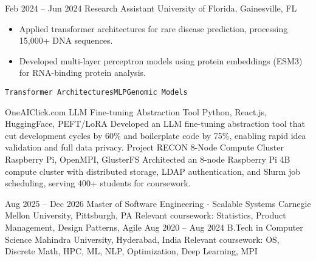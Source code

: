\documentclass[9pt]{developercv} %
\begin{document}
\begin{entrylist}
{        }
	\entry
		{Feb 2024 -- Jun 2024}
		{Research Assistant}
		{University of Florida, Gainesville, FL}
		{
            \begin{itemize}
                \item Applied transformer architectures for rare disease prediction, processing 15,000+ DNA sequences.
                \item Developed multi-layer perceptron models using protein embeddings (ESM3) for RNA-binding protein analysis.
            \end{itemize}
            \texttt{Transformer Architectures}\slashsep\texttt{MLP}\slashsep\texttt{Genomic Models}
        }
\end{entrylist}



\begin{entrylist}
	\entry
		{OneAIClick.com}
		{LLM Fine-tuning Abstraction Tool}
		{Python, React.js, HuggingFace, PEFT/LoRA}
		{Developed an LLM fine-tuning abstraction tool that cut development cycles by 60\% and boilerplate code by 75\%, enabling rapid idea validation and full data privacy.}
	\entry
		{Project RECON}
		{8-Node Compute Cluster}
		{Raspberry Pi, OpenMPI, GlusterFS}
		{Architected an 8-node Raspberry Pi 4B compute cluster with distributed storage, LDAP authentication, and Slurm job scheduling, serving 400+ students for coursework.}
\end{entrylist}



\begin{entrylist}
	\entry
		{Aug 2025 -- Dec 2026}
		{Master of Software Engineering - Scalable Systems}
		{Carnegie Mellon University, Pittsburgh, PA}
		{Relevant coursework: Statistics, Product Management, Design Patterns, Agile}
	\entry
		{Aug 2020 -- Aug 2024}
		{B.Tech in Computer Science}
		{Mahindra University, Hyderabad, India}
		{Relevant coursework: OS, Discrete Math, HPC, ML, NLP, Optimization, Deep Learning, MPI}
\end{entrylist}
\end{document}
